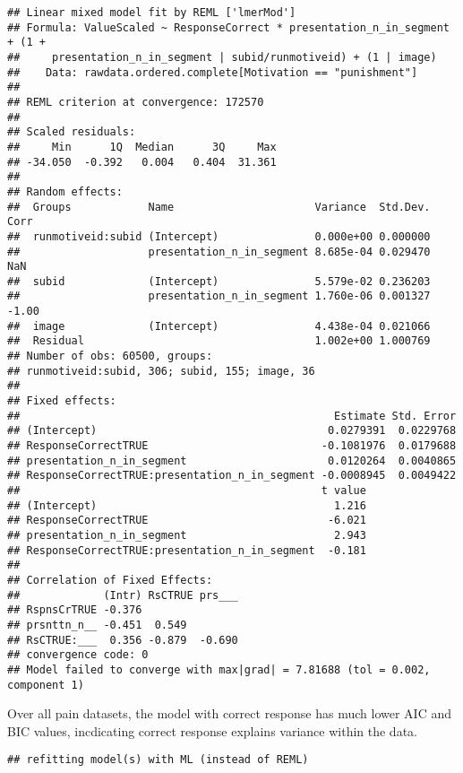\documentclass[]{article}
\begin{document}
\begin{verbatim}
## Linear mixed model fit by REML ['lmerMod']
## Formula: ValueScaled ~ ResponseCorrect * presentation_n_in_segment + (1 +  
##     presentation_n_in_segment | subid/runmotiveid) + (1 | image)
##    Data: rawdata.ordered.complete[Motivation == "punishment"]
## 
## REML criterion at convergence: 172570
## 
## Scaled residuals: 
##     Min      1Q  Median      3Q     Max 
## -34.050  -0.392   0.004   0.404  31.361 
## 
## Random effects:
##  Groups            Name                      Variance  Std.Dev. Corr 
##  runmotiveid:subid (Intercept)               0.000e+00 0.000000      
##                    presentation_n_in_segment 8.685e-04 0.029470  NaN 
##  subid             (Intercept)               5.579e-02 0.236203      
##                    presentation_n_in_segment 1.760e-06 0.001327 -1.00
##  image             (Intercept)               4.438e-04 0.021066      
##  Residual                                    1.002e+00 1.000769      
## Number of obs: 60500, groups:  
## runmotiveid:subid, 306; subid, 155; image, 36
## 
## Fixed effects:
##                                                 Estimate Std. Error
## (Intercept)                                    0.0279391  0.0229768
## ResponseCorrectTRUE                           -0.1081976  0.0179688
## presentation_n_in_segment                      0.0120264  0.0040865
## ResponseCorrectTRUE:presentation_n_in_segment -0.0008945  0.0049422
##                                               t value
## (Intercept)                                     1.216
## ResponseCorrectTRUE                            -6.021
## presentation_n_in_segment                       2.943
## ResponseCorrectTRUE:presentation_n_in_segment  -0.181
## 
## Correlation of Fixed Effects:
##             (Intr) RsCTRUE prs___
## RspnsCrTRUE -0.376               
## prsnttn_n__ -0.451  0.549        
## RsCTRUE:___  0.356 -0.879  -0.690
## convergence code: 0
## Model failed to converge with max|grad| = 7.81688 (tol = 0.002, component 1)
\end{verbatim}

Over all pain datasets, the model with correct response has much lower
AIC and BIC values, incdicating correct response explains variance
within the data.

\begin{verbatim}
## refitting model(s) with ML (instead of REML)
\end{verbatim}
\end{document}
